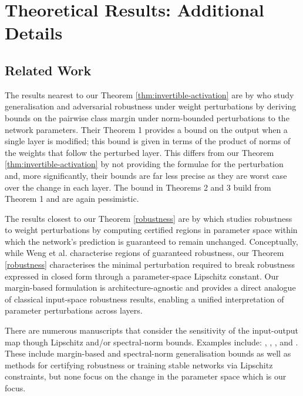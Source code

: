 \documentclass{article}
\theoremstyle{plain}
\theoremstyle{definition}
\theoremstyle{remark}
\begin{document}
\newpage




\newpage
\appendix
\onecolumn
\section{Theoretical Results: Additional Details}
\subsection{Related Work}
The results nearest to our Theorem \ref{thm:invertible-activation} are by \citet{tsai_formalizing_2021} who study generalisation and adversarial robustness under weight perturbations by deriving bounds on the pairwise class margin under norm-bounded perturbations to the network parameters. Their Theorem 1 provides a bound on the output when a single layer is modified; this bound is given in terms of the product of norms of the weights that follow the perturbed layer. This differs from our Theorem \ref{thm:invertible-activation} by not providing the formulae for the perturbation and, more significantly, their bounds are far less precise as they are worst case over the change in each layer. The bound in \citet{tsai_formalizing_2021} Theorems 2 and 3 build from Theorem 1 and are again pessimistic.

The results closest to our Theorem \ref{robustness} are by \citet{weng_towards_2020} which studies robustness to weight perturbations by computing certified regions in parameter space within which the network’s prediction is guaranteed to remain unchanged. Conceptually, while Weng et al. characterise regions of guaranteed robustness, our Theorem \ref{robustness} characterises the minimal perturbation required to break robustness expressed in closed form through a parameter-space Lipschitz constant. Our margin-based formulation is architecture-agnostic and provides a direct analogue of classical input-space robustness results, enabling a unified interpretation of parameter perturbations across layers.

There are numerous manuscripts that consider the sensitivity of the input-output map though Lipschitz and/or spectral-norm bounds. Examples include: \citet{bartlett_spectrally-normalized_2017}, \citet{tsuzuku_lipschitz-margin_2018}, \citet{fazlyab_efficient_2023}, and \citet{pauli_training_2022}. These include margin-based and spectral-norm generalisation bounds as well as methods for certifying robustness or training stable networks via Lipschitz constraints, but none focus on the change in the parameter space which is our focus.
\end{document}
